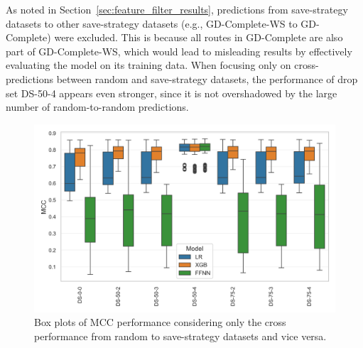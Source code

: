 As noted in Section~\ref{sec:feature_filter_results}, predictions from save-strategy datasets to other save-strategy datasets
(e.g., GD-Complete-WS to GD-Complete) were excluded. This is because all routes in GD-Complete are also part of GD-Complete-WS,
which would lead to misleading results by effectively evaluating the model on its training data. When focusing only on cross-predictions
between random and save-strategy datasets, the performance of drop set DS-50-4 appears even stronger, since it is not overshadowed by
the large number of random-to-random predictions.
\begin{figure}[ht]
	\centering
	\includegraphics[width = .85\textwidth]{pictures/feature_filter/cross_performance_boxplot.png}
	\caption{Box plots of MCC performance considering only the cross performance from random to save-strategy datasets and vice versa.}
	\label{fig:mcc_filter_results_cross}
\end{figure}

